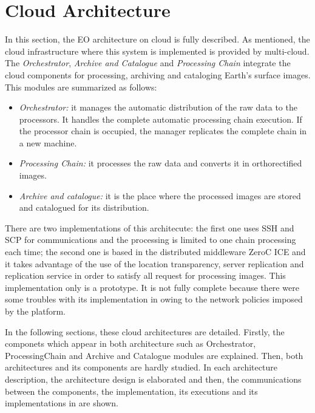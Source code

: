 \section{Cloud Architecture}

In this section, the \ac{EO} architecture on cloud is fully described. As
mentioned, the cloud infrastructure where this system is implemented is provided
by \bonfire multi-cloud. The \emph{Orchestrator}, \emph{Archive and Catalogue} and \emph{Processing
Chain} integrate the cloud components for processing, archiving and cataloging
Earth's surface images. This modules are summarized as follows:
\begin{itemize}
\item \emph{Orchestrator:} it manages the automatic distribution of the raw data to the processors. It handles the complete automatic processing chain execution.  If the processor chain is occupied, the manager replicates the complete chain in a new machine.
\item \emph{Processing Chain:} it processes the raw data and converts it in orthorectified images. 
\item \emph{Archive and catalogue:} it is the place where the processed images are stored and catalogued for its distribution.
\end{itemize}


There are two implementations of this architecute: the first one uses \ac{SSH}
and \ac{SCP} for communications and the processing is limited to one chain
processing each time; the second one is based in the distributed middleware
ZeroC ICE and it takes advantage of the use of the location transparency, server
replication and replication service in order to satisfy all request for
processing images. This implementation only is a prototype. It is not fully
complete because there were some troubles with its implementation in \bonfire
owing to the network policies imposed by the platform. 


In the following sections, these cloud architectures are detailed. Firstly, the
componets which appear in both architecture such as Orchestrator,
ProcessingChain and Archive and Catalogue modules are explained. Then, both
architectures and its components are hardly studied. In each architecture
description, the architecture design is elaborated and then, the communications
between the components, the implementation, its executions and its
implementations in \bonfire are shown.





